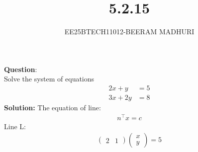 \documentclass[journal]{IEEEtran}
\begin{document}

\vspace{3cm}

\title{5.2.15}
\author{EE25BTECH11012-BEERAM MADHURI}
{\let\newpage\relax\maketitle}

\renewcommand{\thefigure}{\theenumi}
\renewcommand{\thetable}{\theenumi}
\setlength{\intextsep}{10pt} %


\renewcommand{\thetable}{\theenumi}


\textbf{Question}:\\
Solve the system of equations\\
\begin{align*}
    2x + y &=5\\
    3x+2y &=8
\end{align*}
\textbf{Solution:}
The equation of line:
\begin{align}
n^\top x = c
\end{align}
Line L:
\begin{align}
\begin{pmatrix}2 & 1\end{pmatrix}\begin{pmatrix}x \\y\end{pmatrix}= 5
\end{align}
\end{document}
